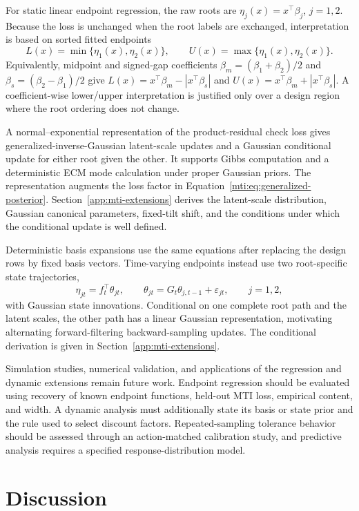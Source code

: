 For static linear endpoint regression, the raw roots are
\(\eta_j(x)=x^\top\beta_j\), \(j=1,2\). Because the loss is unchanged when the
root labels are exchanged, interpretation is based on sorted fitted endpoints
\[
L(x)=\min\{\eta_1(x),\eta_2(x)\},\qquad
U(x)=\max\{\eta_1(x),\eta_2(x)\}.
\]
Equivalently, midpoint and signed-gap coefficients
\(\beta_m=(\beta_1+\beta_2)/2\) and
\(\beta_s=(\beta_2-\beta_1)/2\) give
\(L(x)=x^\top\beta_m-|x^\top\beta_s|\) and
\(U(x)=x^\top\beta_m+|x^\top\beta_s|\).
A coefficient-wise lower/upper interpretation is justified only over a design
region where the root ordering does not change.

A normal--exponential representation of the product-residual check loss gives
generalized-inverse-Gaussian latent-scale updates and a Gaussian conditional
update for either root given the other. It supports Gibbs computation and a
deterministic ECM mode calculation under proper Gaussian priors. The
representation augments the loss factor in
Equation~\eqref{mti:eq:generalized-posterior}.
Section~\ref{app:mti-extensions} derives the latent-scale distribution, Gaussian
canonical parameters, fixed-tilt shift, and the conditions under which the
conditional update is well defined.

Deterministic basis expansions use the same equations after replacing the
design rows by fixed basis vectors. Time-varying endpoints instead use two
root-specific state trajectories,
\[
\eta_{jt}=f_t^\top\theta_{jt},\qquad
\theta_{jt}=G_t\theta_{j,t-1}+\varepsilon_{jt},\qquad j=1,2,
\]
with Gaussian state innovations. Conditional on one complete root path and the
latent scales, the other path has a linear Gaussian representation, motivating
alternating forward-filtering backward-sampling updates. The conditional
derivation is given in Section~\ref{app:mti-extensions}.

Simulation studies, numerical validation, and applications of the regression
and dynamic extensions remain future work.
Endpoint regression should be evaluated using recovery of known endpoint
functions, held-out MTI loss, empirical content, and width. A dynamic analysis
must additionally state its basis or state prior and the rule used to select
discount factors. Repeated-sampling tolerance behavior should be assessed
through an action-matched calibration study, and predictive analysis requires
a specified response-distribution model.

\section{Discussion}
\label{rqr2026:sec:discussion}

